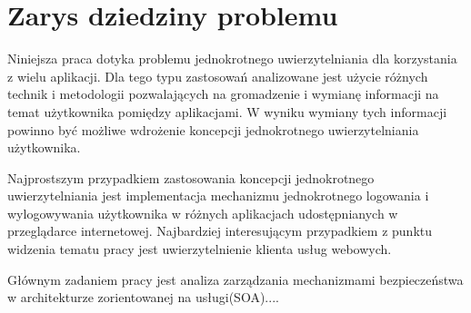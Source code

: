 \section{Zarys dziedziny problemu}
\label{sec:zarysDziedzinyProblemu}

Niniejsza praca dotyka problemu jednokrotnego uwierzytelniania dla korzystania z wielu aplikacji. Dla tego typu zastosowań analizowane jest użycie różnych technik i metodologii pozwalających na gromadzenie i wymianę informacji na temat użytkownika pomiędzy aplikacjami. W wyniku wymiany tych informacji powinno być możliwe wdrożenie koncepcji jednokrotnego uwierzytelniania użytkownika.

Najprostszym przypadkiem zastosowania koncepcji jednokrotnego uwierzytelniania jest implementacja mechanizmu jednokrotnego logowania i wylogowywania użytkownika w różnych aplikacjach udostępnianych w przeglądarce internetowej. Najbardziej interesującym przypadkiem z punktu widzenia tematu pracy jest uwierzytelnienie klienta usług webowych.

Głównym zadaniem pracy jest analiza zarządzania mechanizmami bezpieczeństwa w architekturze zorientowanej na usługi(SOA)....












